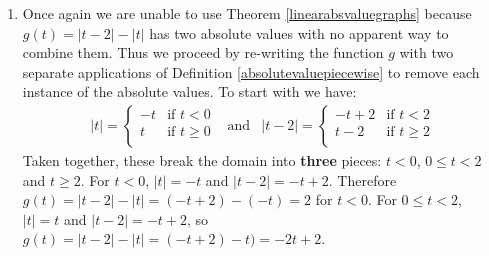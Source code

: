 \documentclass{ximera}
\begin{document}
\begin{example}
\begin{enumerate}
\begin{enumerate}
\begin{image}
\end{image}

The range of $G$ is $[-2, \infty)$ with a minimum value of $-2$ attained for all $x \geq 2$. Moreover, $G$ is decreasing on $(-\infty, 2]$ and then constant on $[2, \infty)$. 
  
\item  Once again we are unable to use Theorem \ref{linearabsvaluegraphs} because $g(t) = |t - 2| - |t|$  has two absolute values with no apparent way to combine them.  Thus we proceed by re-writing the function $g$ with two separate applications of Definition \ref{absolutevaluepiecewise} to remove each instance of the absolute values.  To start with we have: \[ \begin{array}{ccc}

 |t|  = \begin{cases} 
      -t &  \text{if $t  < 0$} \\
     t  & \text{if $t \geq 0$} \\
   \end{cases}
   
 &
 
\text{and}
 
 &
 
 |t - 2|  = \begin{cases} 
     -t + 2 &  \text{if $t < 2$} \\
     t - 2  & \text{if $t \geq 2$} \\
   \end{cases}
   
   \end{array}  \] Taken together, these break the domain into \textbf{three} pieces:  $t < 0$, $0 \leq t < 2$ and $t \geq 2$.  For $t < 0$, $|t| = -t$ and $|t - 2| = -t + 2$.  Therefore $g(t) = |t - 2| - |t| = (-t + 2) - (-t) = 2$  for $t < 0$.  For $0 \leq t < 2$, $|t| = t$ and $|t - 2| = -t + 2$, so $g(t) = |t-2| - |t| = (-t+2) - t) = -2t + 2$.  
	

\end{enumerate}
\end{enumerate}
\end{example}
\end{document}
